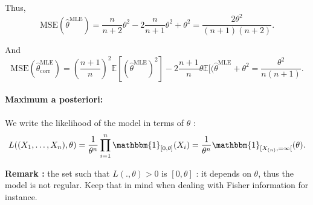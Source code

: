 Thus, $$\text{MSE}(\hat{\theta}^{\text{MLE}}) = \dfrac{n}{n+2}\theta^2 - 2\dfrac{n}{n+1}\theta^2 + \theta^2 = \dfrac{2\theta^2}{(n+1)(n+2)}.$$

And $$\text{MSE}(\hat{\theta}_{\text{corr}}^{\text{MLE}}) = \left(\dfrac{n+1}{n}\right)^2 \mathbb{E}[(\hat{\theta}^{\text{MLE}})^2] - 2\dfrac{n+1}{n}\theta \mathbb{E}[(\hat{\theta}^{\text{MLE}} + \theta^2 = \dfrac{\theta^2}{n(n+1)}.$$

\paragraph*{Maximum a posteriori:}

We write the likelihood of the model in terms of $\theta$ :
$$L((X_1,\dots,X_n), \theta) = \dfrac{1}{\theta^n} \prod_{i=1}^{n} \mathbbm{1}_{[0, \theta]}(X_i) = \dfrac{1}{\theta^n} \mathbbm{1}_{[X_{(n)}, =\infty[}(\theta).$$

\textbf{Remark :} the set such that $L(., \theta)>0$ is $[0, \theta]$ : it depends on $\theta$, thus the model is not regular. Keep that in mind when dealing with Fisher information for instance.\newline

